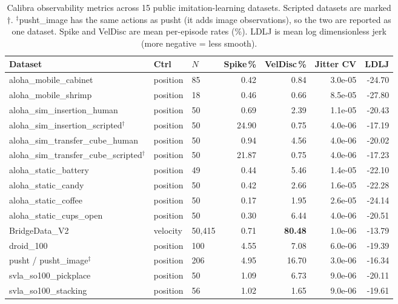 \begin{table}[htbp]
\centering
\caption{Calibra observability metrics across 15 public imitation-learning datasets.
Scripted datasets are marked $\dagger$.
$^\ddagger$pusht\_image has the same actions as pusht (it adds image
observations), so the two are reported as one dataset.
Spike and VelDisc are mean per-episode rates (\%).
LDLJ is mean log dimensionless jerk (more negative = less smooth).}
\label{tab:cross_dataset}
\small
\begin{tabular}{lllrrrr}
\toprule
Dataset & Ctrl & $N$ & Spike\,\% & VelDisc\,\% & Jitter CV & LDLJ \\
\midrule
aloha\_mobile\_cabinet          & position & 85     & 0.42  & 0.84  & 3.0e-05 & -24.70 \\
aloha\_mobile\_shrimp           & position & 18     & 0.46  & 0.66  & 8.5e-05 & -27.80 \\
aloha\_sim\_insertion\_human    & position & 50     & 0.69  & 2.39  & 1.1e-05 & -20.43 \\
aloha\_sim\_insertion\_scripted$^\dagger$ & position & 50 & 24.90 & 0.75 & 4.0e-06 & -17.19 \\
aloha\_sim\_transfer\_cube\_human & position & 50   & 0.94  & 4.56  & 4.0e-06 & -20.02 \\
aloha\_sim\_transfer\_cube\_scripted$^\dagger$ & position & 50 & 21.87 & 0.75 & 4.0e-06 & -17.23 \\
aloha\_static\_battery          & position & 49     & 0.44  & 5.46  & 1.4e-05 & -22.10 \\
aloha\_static\_candy            & position & 50     & 0.42  & 2.66  & 1.6e-05 & -22.28 \\
aloha\_static\_coffee           & position & 50     & 0.17  & 1.95  & 2.6e-05 & -24.14 \\
aloha\_static\_cups\_open       & position & 50     & 0.30  & 6.44  & 4.0e-06 & -20.51 \\
\midrule
BridgeData\_V2                  & velocity & 50{,}415 & 0.71 & \textbf{80.48} & 1.0e-06 & -13.79 \\
droid\_100                      & position & 100    & 4.55  & 7.08  & 6.0e-06 & -19.39 \\
pusht / pusht\_image$^\ddagger$ & position & 206    & 4.95  & 16.70 & 3.0e-06 & -16.34 \\
svla\_so100\_pickplace          & position & 50     & 1.09  & 6.73  & 9.0e-06 & -20.11 \\
svla\_so100\_stacking           & position & 56     & 1.02  & 1.65  & 9.0e-06 & -19.61 \\
\bottomrule
\end{tabular}
\end{table}
